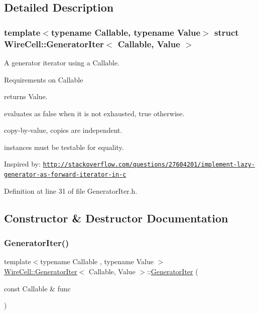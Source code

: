 \subsection{Detailed Description}
\subsubsection*{template$<$typename Callable, typename Value$>$\newline
struct Wire\+Cell\+::\+Generator\+Iter$<$ Callable, Value $>$}

A generator iterator using a Callable.

Requirements on Callable
\begin{DoxyItemize}
\item returns Value.
\item evaluates as false when it is not exhausted, true otherwise.
\item copy-\/by-\/value, copies are independent.
\item instances must be testable for equality.
\end{DoxyItemize}

Inspired by\+: \href{http://stackoverflow.com/questions/27604201/implement-lazy-generator-as-forward-iterator-in-c}{\tt http\+://stackoverflow.\+com/questions/27604201/implement-\/lazy-\/generator-\/as-\/forward-\/iterator-\/in-\/c} 

Definition at line 31 of file Generator\+Iter.\+h.



\subsection{Constructor \& Destructor Documentation}
\mbox{\label{struct_wire_cell_1_1_generator_iter_af83b73da6292cce8ab5548afefa69bb7}} 
\subsubsection{\texorpdfstring{Generator\+Iter()}{GeneratorIter()}}
{\footnotesize\ttfamily template$<$typename Callable , typename Value $>$ \\
\hyperlink{struct_wire_cell_1_1_generator_iter}{Wire\+Cell\+::\+Generator\+Iter}$<$ Callable, Value $>$\+::\hyperlink{struct_wire_cell_1_1_generator_iter}{Generator\+Iter} (\begin{DoxyParamCaption}\item[{const Callable \&}]{func }\end{DoxyParamCaption})\hspace{0.3cm}{\ttfamily [inline]}}



